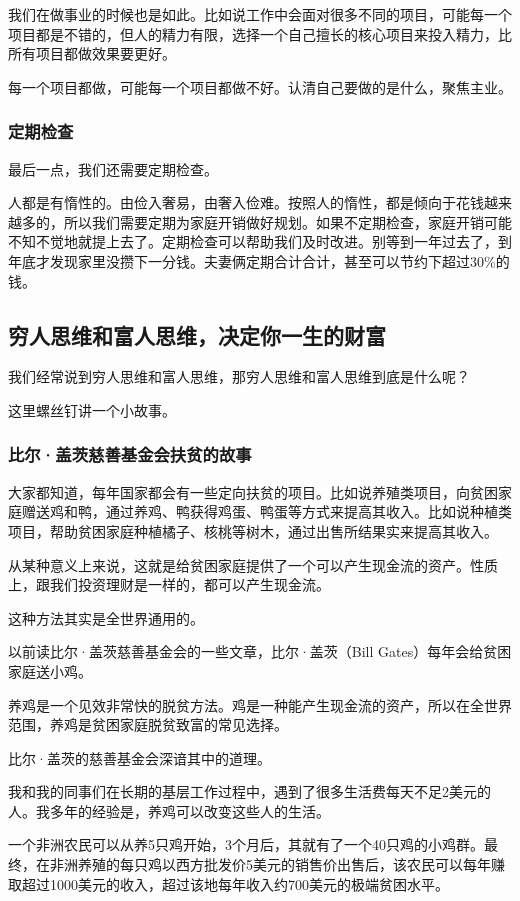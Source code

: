 我们在做事业的时候也是如此。比如说工作中会面对很多不同的项目，可能每一个项目都是不错的，但人的精力有限，选择一个自己擅长的核心项目来投入精力，比所有项目都做效果要更好。

每一个项目都做，可能每一个项目都做不好。认清自己要做的是什么，聚焦主业。

\subsubsection{定期检查}

最后一点，我们还需要定期检查。

人都是有惰性的。由俭入奢易，由奢入俭难。按照人的惰性，都是倾向于花钱越来越多的，所以我们需要定期为家庭开销做好规划。如果不定期检查，家庭开销可能不知不觉地就提上去了。定期检查可以帮助我们及时改进。别等到一年过去了，到年底才发现家里没攒下一分钱。夫妻俩定期合计合计，甚至可以节约下超过30\%的钱。

\subsection{穷人思维和富人思维，决定你一生的财富}
我们经常说到穷人思维和富人思维，那穷人思维和富人思维到底是什么呢？

这里螺丝钉讲一个小故事。

\subsubsection{比尔·盖茨慈善基金会扶贫的故事}

大家都知道，每年国家都会有一些定向扶贫的项目。比如说养殖类项目，向贫困家庭赠送鸡和鸭，通过养鸡、鸭获得鸡蛋、鸭蛋等方式来提高其收入。比如说种植类项目，帮助贫困家庭种植橘子、核桃等树木，通过出售所结果实来提高其收入。

从某种意义上来说，这就是给贫困家庭提供了一个可以产生现金流的资产。性质上，跟我们投资理财是一样的，都可以产生现金流。

这种方法其实是全世界通用的。

以前读比尔·盖茨慈善基金会的一些文章，比尔·盖茨（Bill Gates）每年会给贫困家庭送小鸡。

养鸡是一个见效非常快的脱贫方法。鸡是一种能产生现金流的资产，所以在全世界范围，养鸡是贫困家庭脱贫致富的常见选择。

比尔·盖茨的慈善基金会深谙其中的道理。

{\kaishu 我和我的同事们在长期的基层工作过程中，遇到了很多生活费每天不足2美元的人。我多年的经验是，养鸡可以改变这些人的生活。}

{\kaishu 一个非洲农民可以从养5只鸡开始，3个月后，其就有了一个40只鸡的小鸡群。最终，在非洲养殖的每只鸡以西方批发价5美元的销售价出售后，该农民可以每年赚取超过1000美元的收入，超过该地每年收入约700美元的极端贫困水平。}

